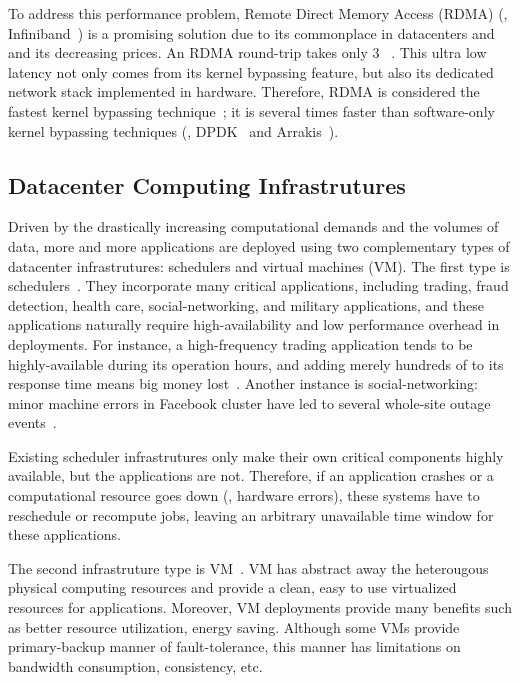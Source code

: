 To address this \paxos performance problem, Remote Direct Memory Access (RDMA) 
(\eg, Infiniband~\cite{infiniband}) is a promising solution due to its 
commonplace in datacenters and and its decreasing prices. An RDMA round-trip 
takes only 3 \us~\cite{pilaf:usenix14}. This ultra low latency not only 
comes from its kernel bypassing feature, but also its dedicated network stack 
implemented in hardware. Therefore, RDMA is considered the fastest kernel 
bypassing technique~\cite{herd:sigcomm14,pilaf:usenix14,dare:hpdc15}; it is 
several times faster than software-only kernel bypassing techniques (\eg, 
DPDK~\cite{dpdk} and Arrakis~\cite{arrakis:osdi14}).

\vspace{-.15in}\subsection{Datacenter Computing Infrastrutures}
\label{sec:datacenter}\vspace{-.075in}



Driven by the drastically increasing computational demands and the volumes of 
data, more and more applications are deployed using two complementary types of 
datacenter infrastrutures: 
schedulers and virtual machines 
(VM). The first type is 
schedulers~\cite{borg:eurosys15,mesos:nsdi11,tupperware, yarn:socc13,
autopilot:sosp07,quincy:sosp09,apollo:osdi14,fuxi:vldb14}. They incorporate 
many critical applications, including trading, 
fraud detection, health care, social-networking, and military applications, and 
these applications naturally require high-availability 
and low performance overhead in deployments. For instance, a high-frequency 
trading application tends to be highly-available during its operation hours, 
and adding merely hundreds of \us to its response time means big money 
lost~\cite{nosql:finance}. Another instance is social-networking: minor machine 
errors in Facebook cluster have led to several whole-site outage 
events~\cite{facebook:outage}.


Existing scheduler infrastrutures only make their own critical components 
highly available, but the applications are not. Therefore, if an application 
crashes or a computational resource goes down (\eg, hardware errors), these 
systems have to reschedule or recompute jobs, leaving an arbitrary unavailable 
time window for these applications.

% 
The second infrastruture type is VM~\cite{amazon:ec2, openstack, vmware}. VM 
has abstract away the heterougous physical computing resources and provide a 
clean, easy to use virtualized resources for applications. Moreover, VM 
deployments provide many benefits such as better resource utilization, energy 
saving. Although some VMs provide primary-backup manner of fault-tolerance, 
this manner has limitations on bandwidth consumption, consistency, etc.

